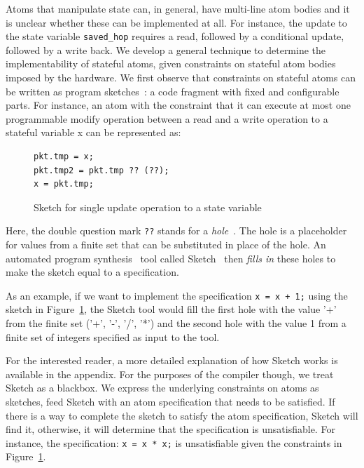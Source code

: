 Atoms that manipulate state can, in general, have multi-line atom bodies and it
is unclear whether these can be implemented at all. For instance, the update to
the state variable \texttt{saved\_hop} requires a read, followed by a
conditional update, followed by a write back. We develop a general technique to
determine the implementability of stateful atoms, given constraints on stateful
atom bodies imposed by the hardware.
We first observe that constraints on stateful atoms can be written as program
sketches~\cite{bitstreaming, finite, sketch_manual}: a code fragment with fixed
and configurable parts. For instance, an atom with the constraint that it can
execute at most one programmable modify operation between a read and a write
operation to a stateful variable x can be represented as:
\begin{figure}
  \begin{lstlisting}[style=customc]
pkt.tmp = x;
pkt.tmp2 = pkt.tmp ?? (??);
x = pkt.tmp;
\end{lstlisting}
\caption{Sketch for single update operation to a state variable}
\label{fig:sketch_for_state}
\end{figure}
Here, the double question mark \texttt{??} stands for a
\textit{hole}~\cite{sketch_manual}. The hole is a placeholder for values from a
finite set that can be substituted in place of the hole. An automated program
synthesis~\cite{synthesis} tool called Sketch~\cite{sketch_manual} then
\textit{fills in} these holes to make the sketch equal to a specification.

As an example, if we want to implement the specification \texttt{x = x + 1;}
using the sketch in Figure~\ref{fig:sketch_for_state}, the Sketch tool would
fill the first hole with the value '+' from the finite set ('+', '-', '/', '*')
and the second hole with the value 1 from a finite set of integers specified as
input to the tool.

For the interested reader, a more detailed explanation of how Sketch works is
available in the appendix. For the purposes of the \pktlanguage compiler
though, we treat Sketch as a blackbox. We express the underlying constraints on
atoms as sketches, feed Sketch with an atom specification that needs to be
satisfied.  If there is a way to complete the sketch to satisfy the atom
specification, Sketch will find it, otherwise, it will determine that the
specification is unsatisfiable. For instance, the specification: \texttt{x = x
* x;} is unsatisfiable given the constraints in
Figure~\ref{fig:sketch_for_state}.

